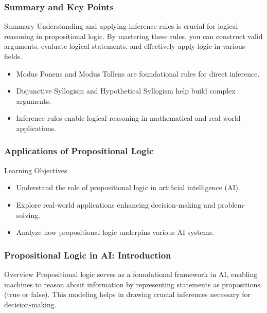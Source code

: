 \documentclass[aspectratio=169]{beamer}
\begin{document}
\begin{frame}[fragile]
    \frametitle{Summary and Key Points}
    \begin{block}{Summary}
        Understanding and applying inference rules is crucial for logical reasoning in propositional logic. By mastering these rules, you can construct valid arguments, evaluate logical statements, and effectively apply logic in various fields.
    \end{block}
    \begin{itemize}
        \item Modus Ponens and Modus Tollens are foundational rules for direct inference.
        \item Disjunctive Syllogism and Hypothetical Syllogism help build complex arguments.
        \item Inference rules enable logical reasoning in mathematical and real-world applications.
    \end{itemize}
\end{frame}

\begin{frame}[fragile]
    \frametitle{Applications of Propositional Logic}
    \begin{block}{Learning Objectives}
        \begin{itemize}
            \item Understand the role of propositional logic in artificial intelligence (AI).
            \item Explore real-world applications enhancing decision-making and problem-solving.
            \item Analyze how propositional logic underpins various AI systems.
        \end{itemize}
    \end{block}
\end{frame}

\begin{frame}[fragile]
    \frametitle{Propositional Logic in AI: Introduction}
    \begin{block}{Overview}
        Propositional logic serves as a foundational framework in AI, enabling machines to reason about information by representing statements as propositions (true or false). This modeling helps in drawing crucial inferences necessary for decision-making.
    \end{block}
\end{frame}
\end{document}
